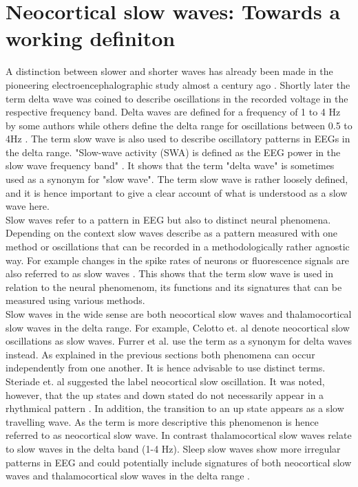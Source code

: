 \section{Neocortical slow waves: Towards a working definiton}
\label{working_definition}
A distinction between slower and shorter waves has already been made in the pioneering electroencephalographic study almost a century ago \parencite[p. 550]{berger1929}. Shortly later the term delta wave was coined to describe oscillations in the recorded voltage in the respective frequency band. Delta waves are defined for a frequency of 1 to 4 Hz by some authors \parencite{kubin2019interactions} while others define the delta range for oscillations between 0.5 to 4Hz \parencite{dossi1992electrophysiology}. The term slow wave is also used to describe oscillatory patterns in EEGs in the delta range. "Slow-wave activity (SWA) is defined as the EEG power in the slow wave frequency band" \parencite[p. 1]{furrer2019sleep}. It shows that the term "delta wave" is sometimes used as a synonym for "slow wave". The term slow wave is rather loosely defined, and it is hence important to give a clear account of what is understood as a slow wave here.\\
Slow waves refer to a pattern in EEG but also to distinct neural phenomena. Depending on the context slow waves describe as a pattern measured with one method or oscillations that can be recorded in a methodologically rather agnostic way. For example changes in the spike rates of neurons or fluorescence signals are also referred to as slow waves \parencite{jercog2017up, stroh2013making}. This shows that the term slow wave is used in relation to the neural phenomenom, its functions and its signatures that can be measured using various methods.\\
Slow waves in the wide sense are both neocortical slow waves and thalamocortical slow waves in the delta range. For example, Celotto et. al \parencite*{celotto2020analysis} denote neocortical slow oscillations as slow waves. Furrer et al. \parencite*{furrer2019sleep} use the term as a synonym for delta waves instead. As explained in the previous sections both phenomena can occur independently from one another. It is hence advisable to use distinct terms. Steriade et. al \parencite*{steriade1993novel} suggested the label neocortical slow oscillation. It was noted, however, that the up states and down stated do not necessarily appear in a rhythmical pattern \parencite{brown2012control}. In addition, the transition to an up state appears as a slow travelling wave. As the term is more descriptive this phenomenon is hence referred to as neocortical slow wave. In contrast thalamocortical slow waves relate to slow waves in the delta band (1-4 Hz). Sleep slow waves show more irregular patterns in EEG and could potentially include signatures of both neocortical slow waves and thalamocortical slow waves in the delta range \parencite{steriade1993novel}.\\
